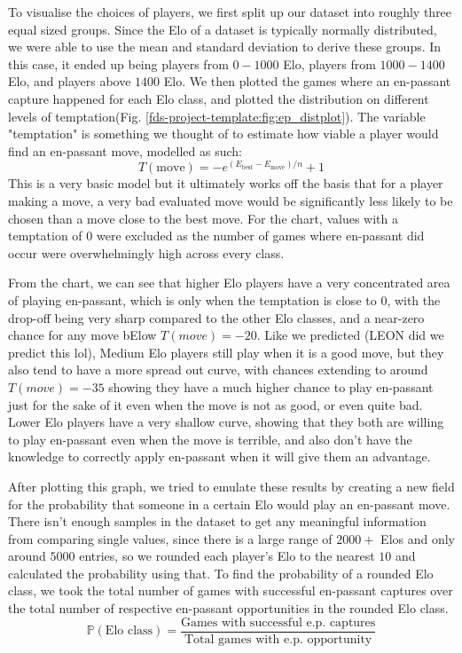 \documentclass[10pt,a4paper,twocolumn]{article}
\begin{document}
To visualise the choices of players, we first split up our dataset into roughly three equal sized groups. Since the Elo of a dataset is typically normally distributed, we were able to use the mean and standard deviation to derive these groups. In this case, it ended up being players from $0 - 1000$ Elo, players from $1000 - 1400$ Elo, and players above $1400$ Elo. We then plotted the games where an en-passant capture happened for each Elo class, and plotted the distribution on different levels of temptation(Fig. \ref{fds-project-template:fig:ep_distplot}). The variable "temptation" is something we thought of to estimate how viable a player would find an en-passant move, modelled as such:
$$T(\text{move})= -e^{(E_{\text{best}} - E_{\text{move}})/{n}} + 1$$
This is a very basic model but it ultimately works off the basis that for a player making a move, a very bad evaluated move would be significantly less likely to be chosen than a move close to the best move. For the chart, values with a temptation of $0$ were excluded as the number of games where en-passant did occur were overwhelmingly high across every class.\newline

From the chart, we can see that higher Elo players have a very concentrated area of playing en-passant, which is only when the temptation is close to $0$, with the drop-off being very sharp compared to the other Elo classes, and a near-zero chance for any move bElow $T(move)=-20$. Like we predicted (LEON did we predict this lol), Medium Elo players still play when it is a good move, but they also tend to have a more spread out curve, with chances extending to around $T(move) = -35$ showing they have a much higher chance to play en-passant just for the sake of it even when the move is not as good, or even quite bad. Lower Elo players have a very shallow curve, showing that they both are willing to play en-passant even when the move is terrible, and also don't have the knowledge to correctly apply en-passant when it will give them an advantage. \newline

After plotting this graph, we tried to emulate these results by creating a new field for the probability that someone in a certain Elo would play an en-passant move. There isn't enough samples in the dataset to get any meaningful information from comparing single values, since there is a large range of $2000+$ Elos and only around $5000$ entries, so we rounded each player's Elo to the nearest $10$ and calculated the probability using that. To find the probability of a rounded Elo class, we took the total number of games with successful en-passant captures over the total number of respective en-passant opportunities in the rounded Elo class.
$$\mathbb{P}(\text{Elo class}) = \frac{\text{Games with successful e.p. captures}}{\text{Total games with e.p. opportunity}}$$
\end{document}
